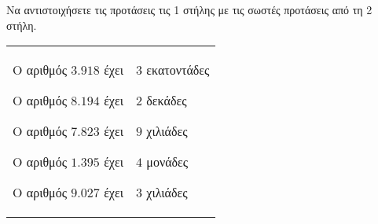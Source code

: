 Να αντιστοιχήσετε τις προτάσεις τις 1 στήλης με τις σωστές προτάσεις από τη 2 στήλη.
\vspace{-5mm}
\begin{flushleft}
\begin{tabular}{p{3.7cm}p{3.7cm}}
\begin{rlist}[leftmargin=2mm]
\item Ο αριθμός $ 3.918 $ έχει
\item Ο αριθμός $ 8.194 $ έχει
\item Ο αριθμός $ 7.823 $ έχει
\item Ο αριθμός $ 1.395 $ έχει
\item Ο αριθμός $ 9.027 $ έχει
\end{rlist} & 
\begin{rlist}
\item $ 3 $ εκατοντάδες
\item $ 2 $ δεκάδες
\item $ 9 $ χιλιάδες
\item $ 4 $ μονάδες
\item $ 3 $ χιλιάδες
\end{rlist} \\ 
\end{tabular} 
\end{flushleft}
